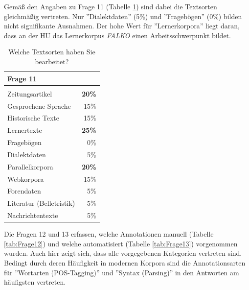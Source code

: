 Gemäß den Angaben zu Frage 11 (Tabelle \ref{tab:Frage11}) sind dabei die Textsorten gleichmäßig vertreten. Nur ''Dialektdaten'' (5\%) und ''Fragebögen'' (0\%) bilden nicht signifikante Ausnahmen. Der hohe Wert für ''Lernerkorpora'' liegt daran, dass an der HU das Lernerkorpus \emph{FALKO} \citep[vgl.][]{luedeling2005lernercorpora} einen Arbeitsschwerpunkt bildet.

	\begin{table}[H]
		\centering
		\begin{tabular}{l | r}
					Frage 11 &  \\
					\hline\\
					Zeitungsartikel			& \bf{20\%} \\
					Gesprochene Sprache	&  15\% \\
					Historische Texte		&  15\% \\
					Lernertexte			& \bf{25\%} \\
					Fragebögen			& 0\% \\
					Dialektdaten			& 5\% \\
					Parallelkorpora 		& \bf{20\%} \\
					Webkorpora 			& 15\% \\
					\hline
					Forendaten 			& 5\% \\
					Literatur (Belletristik)	& 5\% \\
					Nachrichtentexte		& 5\%
		\end{tabular}
		\caption{Welche Textsorten haben Sie bearbeitet?}\label{tab:Frage11}
	\end{table}

Die Fragen 12 und 13 erfassen, welche Annotationen manuell (Tabelle \ref{tab:Frage12}) und welche automatisiert (Tabelle \ref{tab:Frage13}) vorgenommen wurden. Auch hier zeigt sich, dass alle vorgegebenen Kategorien vertreten sind. Bedingt durch deren Häufigkeit in modernen Korpora sind die Annotationsarten für ''Wortarten (POS-Tagging)'' und ''Syntax (Parsing)'' in den Antworten am häufigsten vertreten.


